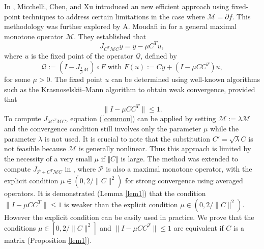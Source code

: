 \documentclass[11pt]{article}
\def\beq{\begin{equation}}
\def\eeq{\end{equation}}
\theoremstyle{plain}
\newcommand{\tcr}{\textcolor{red}}
\begin{document}
In \cite{Micchelli}, Micchelli, Chen, and Xu introduced an new efficient approach using fixed-point techniques to address certain limitations in the case where $\mathcal{M} = \partial f$. This methodology was further explored by A. Moudafi in \cite{Moudafi} for a general maximal monotone operator $\mathcal{M}$. They established that
\begin{equation}\label{commou}
J_{C^T \mathcal{M} C} y = y - \mu C^T u,
\end{equation}
where $u$ is the fixed point of the operator $\mathcal{Q}$, defined by 
\begin{equation}\label{commou1}
\mathcal{Q} := (I - J_{\mathcal{\frac{1}{\mu} M}}) \circ F \mbox{ with } F(u) := Cy + (I - \mu CC^T)u,
\end{equation}
 for some $\mu > 0$. The fixed point $u$ can be determined using well-known algorithms such as the Krasnoselskii--Mann algorithm to obtain weak convergence, provided that 
\beq\label{fc}
\| I - \mu CC^T \| \leq 1.
\eeq
 To compute $J_{\lambda C^T \mathcal{M} C}$, equation (\ref{commou}) can be applied by setting $\mathcal{M}:= \lambda \mathcal{M}$ and the convergence condition  still involves only the parameter $\mu$ while the parameter $\lambda$ is not used. {It is crucial to note that the substitution $C' = \sqrt{\lambda} C$ is not feasible because $\mathcal{M}$ is generally nonlinear}. Thus this approach is limited by the necessity of a very small $\mu$ if $\Vert C\Vert $ is large. The method was extended to compute $J_{\mathcal{P} + C^T \mathcal{M} C}$ in \cite{chen}, where $\mathcal{P}$ is also a maximal monotone operator, with the explicit condition $\mu \in (0, 2/\| C \|^{2})$ for strong convergence using averaged operators. It is demonstrated (Lemma \ref{lem1}) that the condition $\| I - \mu CC^T \| \leq 1$ is weaker than the explicit condition $\mu \in (0, 2/\| C \|^{2})$. However the explicit condition can be easily used  in practice. We prove that the conditions $\mu \in [0, 2/\| C \|^{2}]$ and  $\| I - \mu CC^T \| \leq 1$ are equivalent if $C$ is a matrix (Proposition \ref{lem1}). 
\end{document}
